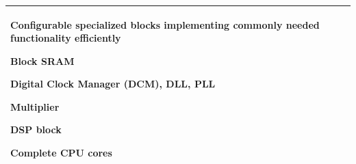 \begin{longtable}{|p{}|p{}|}
				Configurable specialized blocks
				implementing commonly needed functionality efficiently
				\begin{compactitem}
					\item Block SRAM
					\item Digital Clock Manager (DCM), DLL, PLL
					\item Multiplier
					\item DSP block
					\item Complete CPU cores
				\end{compactitem}\\
			\hline
		\end{longtable}
		
	